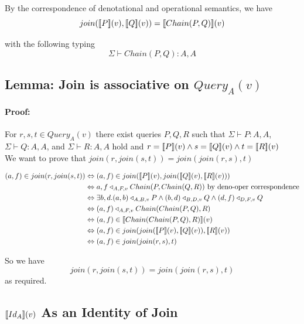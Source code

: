 \documentclass[12pt,a4paper,twoside,openright]{report}
\newcommand{\db}[1]{{\bf [\![}#1{\bf ]\!]}}
\newcommand{\deno}[1]{\db{#1}(v)}
\newcommand{\typeRule}[2]{\Sigma\vdash #1 \colon #2}
\newcommand{\denoRule}[2]{#1 \in \deno{#2}}
\newcommand{\opRule}[3]{#1 \triangleleft_{#2, v} #3}
\newcommand{\queryT}[1]{Query_{#1}(v)}
\begin{document}
By the correspondence of denotational and operational semantics, we have
	\begin{equation}
		join(\deno{P}, \deno{Q}) = \deno{Chain(P, Q)}
	\end{equation}
	
	with the following typing
	\begin{equation}
	\typeRule{Chain(P, Q)}{A, A}
	\end{equation}
	 
\subsection{Lemma: Join is associative on $\queryT{A}$}
\paragraph{Proof:} For $r, s, t \in \queryT{A}$ there exist queries $P, Q, R$ such that $\typeRule{P}{A, A}$, $\typeRule{Q}{A, A}$, and $\typeRule{R}{A, A}$  hold and $r = \deno{P} \wedge s = \deno{Q} \wedge t = \deno{R}$
\\We want to prove that $join(r, join(s, t)) = join(join(r, s), t)$

\begin{equation}\label{Well typed}
\begin{split}
(a, f) \in join(r, join(s, t)) & \Leftrightarrow (a, f) \in join(\deno{P}, join(\deno{Q},\deno{R}))\\
							  & \Leftrightarrow \opRule{a,f}{A, F}{Chain(P, Chain(Q, R))} \mbox{ by deno-oper correspondence}\\
							& \Leftrightarrow \exists b, d. \opRule{(a, b)}{A, B}{P} \wedge \opRule{(b,d)}{B,D}{Q} \wedge \opRule{(d,f)}{D,F}{Q}\\
							& \Leftrightarrow \opRule{(a, f)}{A, F}{Chain(Chain(P, Q), R)}\\
							& \Leftrightarrow \denoRule{(a, f)}{Chain(Chain(P, Q), R)}\\
							& \Leftrightarrow (a, f) \in join(join(\deno{P}, \deno{Q}), \deno{R})\\
							& \Leftrightarrow (a, f) \in join(join(r, s), t)\\							
\end{split}
\end{equation}

So we have \[ join(r, join(s, t)) = join(join(r, s), t) \] as required.

\subsection{$\deno{Id_A}$ As an Identity of Join}
\end{document}
